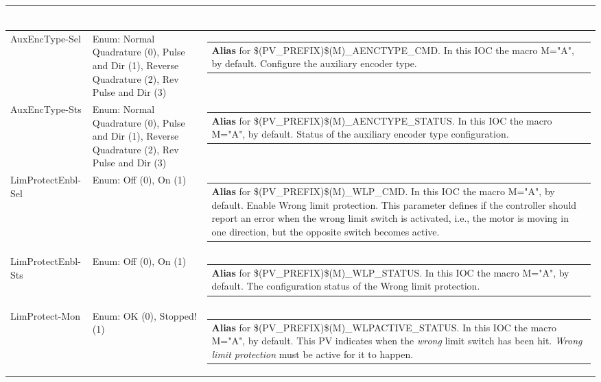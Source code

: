 \documentclass[openany]{article}
\begin{document}
\begin{longtable}{| m{4.5cm} m{2.5cm}  m{8.5cm} |}
\begin{tabular}{@{}m{6cm}@{}}
            \end{tabular} \hypertarget{pv:aux-enc-type}{}\\ \hline
        AuxEncType-Sel & Enum: Normal Quadrature (0), Pulse and Dir (1), Reverse Quadrature (2), Rev Pulse and Dir (3) & \begin{tabular}{@{}m{6cm}@{}}
                \textbf{\color{blue} Alias} for \$(PV\_PREFIX)\$(M)\_AENCTYPE\_CMD. In this IOC the macro M="A", by default. Configure the auxiliary encoder type.
            \end{tabular} \hypertarget{}{}\\ \hline
        AuxEncType-Sts & Enum: Normal Quadrature (0), Pulse and Dir (1), Reverse Quadrature (2), Rev Pulse and Dir (3) & \begin{tabular}{@{}m{6cm}@{}}
                \textbf{\color{blue} Alias} for \$(PV\_PREFIX)\$(M)\_AENCTYPE\_STATUS. In this IOC the macro M="A", by default. Status of the auxiliary encoder type configuration.
            \end{tabular} \hypertarget{pv:lim-protect-enbl}{}\\ \hline
        LimProtectEnbl-Sel & Enum: Off (0), On (1) & \begin{tabular}{@{}m{6cm}@{}}
                \textbf{\color{blue} Alias} for \$(PV\_PREFIX)\$(M)\_WLP\_CMD. In this IOC the macro M="A", by default. Enable Wrong limit protection. This parameter defines if the controller should report an error when the wrong limit switch is activated, i.e., the motor is moving in one direction, but the opposite switch becomes active.
            \end{tabular} \hypertarget{}{}\\ \hline
        LimProtectEnbl-Sts & Enum: Off (0), On (1) & \begin{tabular}{@{}m{6cm}@{}}
                \textbf{\color{blue} Alias} for \$(PV\_PREFIX)\$(M)\_WLP\_STATUS. In this IOC the macro M="A", by default. The configuration status of the Wrong limit protection.
            \end{tabular} \hypertarget{pv:lim-protect-mon}{}\\ \hline
        LimProtect-Mon & Enum: OK (0), Stopped! (1) & \begin{tabular}{@{}m{6cm}@{}}
                \textbf{\color{blue} Alias} for \$(PV\_PREFIX)\$(M)\_WLPACTIVE\_STATUS. In this IOC the macro M="A", by default. This PV indicates when the \emph{wrong} limit switch has been hit. \emph{Wrong limit protection} must be active for it to happen.

\end{tabular}
\end{longtable}
\end{document}
